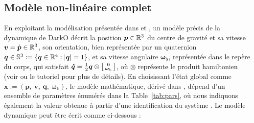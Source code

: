 \subsection{Modèle non-linéaire complet}

En exploitant la modélisation présentée dans \cite{lustosaHal-03035938} et \cite{olszaneckibarthHal-02542982}, un modèle précis de la dynamique de DarkO décrit la position $\boldsymbol{p} \in {\mathbb R}^3$ du centre de gravité et sa vitesse $\boldsymbol{v} = \dot{\boldsymbol{p}} \in {\mathbb R}^3$, son orientation, bien représentée par un quaternion $\boldsymbol{q} \in {\mathbb S}^3:=\{ \boldsymbol{q} \in {\mathbb R}^4 : |\boldsymbol{q}| = 1\}$, et  sa vitesse angulaire $\boldsymbol{\omega}_{\text{b}}$, représentée dans le repère du corps, qui satisfait $\boldsymbol{\dot q} = \frac{1}{2}\boldsymbol{q} \otimes \left[ \begin{smallmatrix}0 \\ \boldsymbol{\omega}_{{\text{b}}} \end{smallmatrix} \right]$, où $\otimes$ représente le produit hamiltonien (voir \cite{lustosaHal-03035938,olszaneckibarthHal-02542982} ou le tutoriel \cite{hamel_minhduc} pour plus de détails).
En choisissant l'état global comme $\boldsymbol{x}:=(\boldsymbol{p},~ \boldsymbol{v},~ \boldsymbol{q},~ \boldsymbol{\omega}_{\text{b}})$, le modèle mathématique, dérivé dans \cite{lustosaHal-03035938}, dépend d'un ensemble de paramètres énumérés dans la Table~\ref{tab:pars}, où nous indiquons également la valeur obtenue à partir d'une identification du système \cite{sansouStage}. Le modèle dynamique peut être écrit comme ci-dessous :

